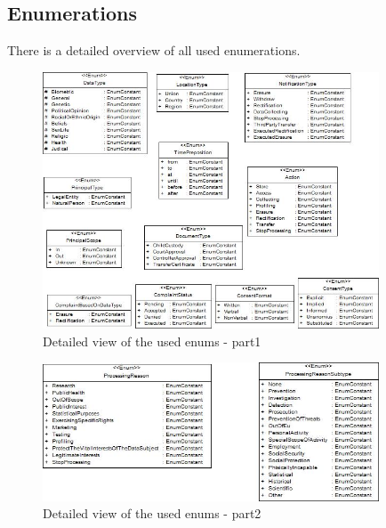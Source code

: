 \documentclass[11pt,english]{article}
\begin{document}
\subsection{Enumerations}
There is a detailed overview of all used enumerations.
\begin{figure}[H]
    \centering
    \includegraphics[width=10cm,scale=0.5]{images/enums1.jpg}
    \caption{Detailed view of the used enums - part1}
    \label{fig:Enums1}
\end{figure}
\begin{figure}[H]
    \centering
    \includegraphics[width=10cm,scale=0.5]{images/enums2.jpg}
    \caption{Detailed view of the used enums - part2}
    \label{fig:Enums2}
\end{figure}
\end{document}
